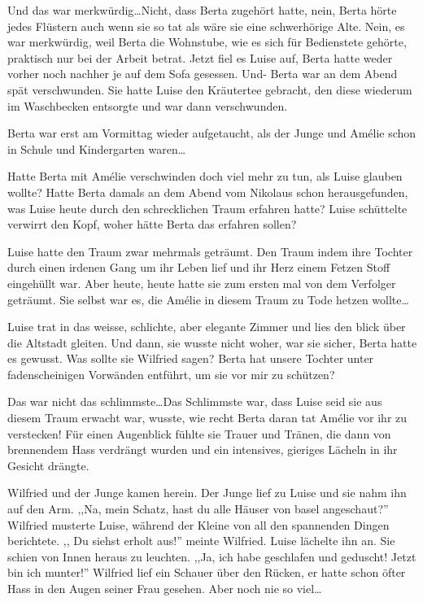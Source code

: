 \documentclass[11pt,titlepage,a5paper]{book}
\newcommand{\am}{Amélie }
\begin{document}
Und das war merkwürdig\dots Nicht, dass Berta zugehört hatte, nein, Berta hörte jedes Flüstern auch wenn sie so tat als wäre sie eine schwerhörige Alte. Nein, es war merkwürdig, weil Berta die Wohnstube, wie es sich für Bedienstete gehörte, praktisch nur bei der Arbeit betrat. Jetzt fiel es Luise auf, Berta hatte weder vorher noch nachher je auf dem Sofa gesessen. Und- Berta war an dem Abend spät verschwunden. Sie hatte Luise den Kräutertee gebracht, den diese wiederum im Waschbecken entsorgte und war dann verschwunden.

Berta war erst am Vormittag wieder aufgetaucht, als der Junge und \am schon in Schule und Kindergarten waren\dots

Hatte Berta mit \am verschwinden doch viel mehr zu tun, als Luise glauben wollte? Hatte Berta damals an dem Abend vom Nikolaus schon herausgefunden, was Luise heute durch den schrecklichen Traum erfahren hatte? Luise schüttelte verwirrt den Kopf, woher hätte Berta das erfahren sollen?

Luise hatte den Traum zwar mehrmals geträumt. Den Traum indem ihre Tochter durch einen irdenen Gang um ihr Leben lief und ihr Herz einem Fetzen Stoff eingehüllt war. Aber heute, heute hatte sie zum ersten mal von dem Verfolger geträumt. Sie selbst war es, die \am in diesem Traum zu Tode hetzen wollte\dots

Luise trat in das weisse, schlichte, aber elegante Zimmer und lies den blick über die Altstadt gleiten. Und dann, sie wusste nicht woher, war sie sicher, Berta hatte es gewusst. Was sollte sie Wilfried sagen? Berta hat unsere Tochter unter fadenscheinigen Vorwänden entführt, um sie vor mir zu schützen?

Das war nicht das schlimmste\dots Das Schlimmste war, dass Luise seid sie aus diesem Traum erwacht war, wusste, wie recht Berta daran tat \am vor ihr zu verstecken! Für einen Augenblick fühlte sie Trauer und Tränen, die dann von brennendem Hass verdrängt wurden und ein intensives, gieriges Lächeln in ihr Gesicht drängte.

Wilfried und der Junge kamen herein. Der Junge lief zu Luise und sie nahm ihn auf den Arm. ,,Na, mein Schatz, hast du alle Häuser von basel angeschaut?'' Wilfried musterte Luise, während der Kleine von all den spannenden Dingen berichtete. ,, Du siehst erholt aus!'' meinte Wilfried. Luise lächelte ihn an. Sie schien von Innen heraus zu leuchten. ,,Ja, ich habe geschlafen und geduscht! Jetzt bin ich munter!'' Wilfried lief ein Schauer über den Rücken, er hatte schon öfter Hass in den Augen seiner Frau gesehen. Aber noch nie so viel\dots
\end{document}
